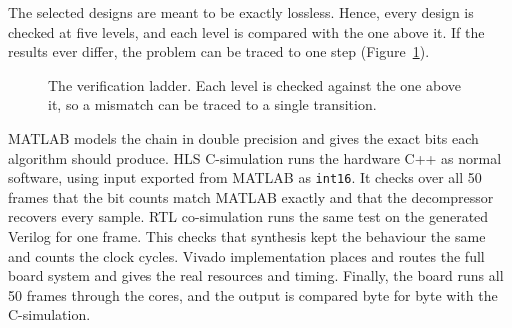 The selected designs are meant to be exactly lossless. Hence, every design is
checked at five levels, and each level is compared with the one above it. If
the results ever differ, the problem can be traced to one step
(Figure~\ref{fig:ladder}).

\begin{figure}[t]
\centering
{}
\caption[The verification ladder]{The verification ladder. Each level is checked
against the one above it, so a mismatch can be traced to a single
transition.}
\label{fig:ladder}
\end{figure}

MATLAB models the chain in double precision and gives the exact bits each
algorithm should produce. HLS C-simulation runs the hardware C++ as normal
software, using input exported from MATLAB as \texttt{int16}. It checks over all
50 frames that the bit counts match MATLAB exactly and that the decompressor
recovers every sample. RTL co-simulation runs the same test on the generated
Verilog for one frame. This checks that synthesis kept the behaviour the same
and counts the clock cycles. Vivado implementation places and routes the full
board system and gives the real resources and timing. Finally, the board runs
all 50 frames through the cores, and the output is compared byte for byte with
the C-simulation.

